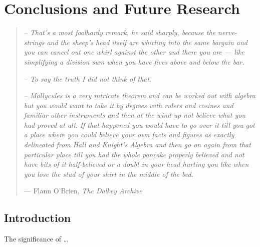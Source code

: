 %
%
%
%

\chapter{Conclusions and Future Research}\label{C.Conclusions.Future.research}

\begin{quote}
\textit{-- That's a most foolhardy remark, he said sharply, because the nerve-strings and 
the sheep's head itself are whirling into the same bargain and you can cancel out one whirl 
against the other and there you are --- like simplifying a division sum when you have fives 
above and below the bar.}

\textit{-- To say the truth I did not think of that.} 

\textit{-- Mollycules is a very intricate theorem and can be worked out with algebra but you 
would want to take it by degrees with rulers and cosines and familiar other instruments and 
then at the wind-up not believe what you had proved at all.  If that happened you would have 
to go over it till you got a place where you could believe your own facts and figures as 
exactly delineated from Hall and Knight's Algebra and then go on again from that particular 
place till you had the whole pancake properly believed and not have bits of it half-believed 
or a doubt in your head hurting you like when you lose the stud of your shirt in the middle 
of the bed.} 

\hspace{2cm}--- Flann O'Brien, \emph{The Dalkey Archive}
\end{quote}


\section{Introduction}\label{S.Concl.intro}

The significance of \ldots

